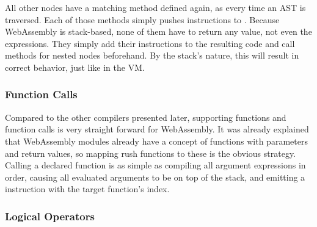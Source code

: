 All other nodes have a matching method defined again, as every time an AST is traversed.
Each of those methods simply pushes instructions to .
Because WebAssembly is stack-based, none of them have to return any value, not even the expressions.
They simply add their instructions to the resulting code and call methods for nested nodes beforehand.
By the stack's nature, this will result in correct behavior, just like in the VM.

\subsubsection{Function Calls}

Compared to the other compilers presented later, supporting functions and function calls is very straight forward for WebAssembly.
It was already explained that WebAssembly modules already have a concept of functions with parameters and return values, so mapping rush functions to these is the obvious strategy.
Calling a declared function is as simple as compiling all argument expressions in order, causing all evaluated arguments to be on top of the stack, and emitting a  instruction with the target function's index.

\subsubsection{Logical Operators}


